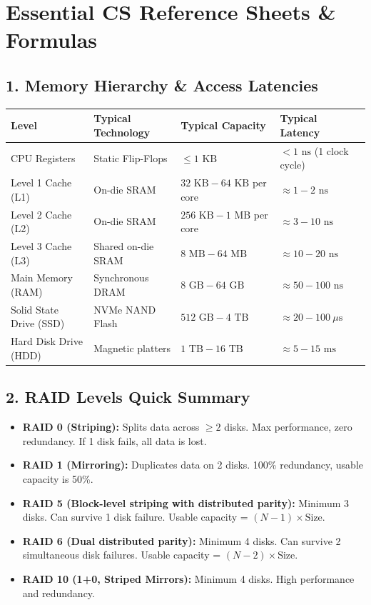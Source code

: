 \chapter*{Essential CS Reference Sheets \& Formulas}

\section*{1. Memory Hierarchy \& Access Latencies}
\begin{center}
\small
\begin{tabular}{|l|l|l|l|}
\hline
\textbf{Level} & \textbf{Typical Technology} & \textbf{Typical Capacity} & \textbf{Typical Latency} \\
\hline
CPU Registers & Static Flip-Flops & $\le 1\text{ KB}$ & $< 1\text{ ns}$ (1 clock cycle) \\
Level 1 Cache (L1) & On-die SRAM & $32\text{ KB} - 64\text{ KB}$ per core & $\approx 1 - 2\text{ ns}$ \\
Level 2 Cache (L2) & On-die SRAM & $256\text{ KB} - 1\text{ MB}$ per core & $\approx 3 - 10\text{ ns}$ \\
Level 3 Cache (L3) & Shared on-die SRAM & $8\text{ MB} - 64\text{ MB}$ & $\approx 10 - 20\text{ ns}$ \\
Main Memory (RAM) & Synchronous DRAM & $8\text{ GB} - 64\text{ GB}$ & $\approx 50 - 100\text{ ns}$ \\
Solid State Drive (SSD) & NVMe NAND Flash & $512\text{ GB} - 4\text{ TB}$ & $\approx 20 - 100\ \mu\text{s}$ \\
Hard Disk Drive (HDD) & Magnetic platters & $1\text{ TB} - 16\text{ TB}$ & $\approx 5 - 15\text{ ms}$ \\
\hline
\end{tabular}
\end{center}

\vspace{3mm}

\section*{2. RAID Levels Quick Summary}
\begin{itemize}[leftmargin=8mm]
    \item \textbf{RAID 0 (Striping):} Splits data across $\ge 2$ disks. Max performance, zero redundancy. If 1 disk fails, all data is lost.
    \item \textbf{RAID 1 (Mirroring):} Duplicates data on 2 disks. 100\% redundancy, usable capacity is 50\%.
    \item \textbf{RAID 5 (Block-level striping with distributed parity):} Minimum 3 disks. Can survive 1 disk failure. Usable capacity = $(N - 1) \times \text{Size}$.
    \item \textbf{RAID 6 (Dual distributed parity):} Minimum 4 disks. Can survive 2 simultaneous disk failures. Usable capacity = $(N - 2) \times \text{Size}$.
    \item \textbf{RAID 10 (1+0, Striped Mirrors):} Minimum 4 disks. High performance and redundancy.
\end{itemize}

